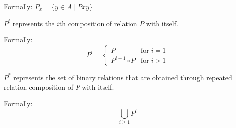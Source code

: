 \begin{definition}
\begin{subdefinition}
    Formally: \(P_x = \{ y \in A \mid Pxy \}\)
    \label{def:rel-acq} %
\end{subdefinition}

\begin{subdefinition}
    \(P^i\) represents the \(i\)th composition of relation \(P\) with itself.

    Formally: 
    \[
        P^i = 
        \begin{cases}
            P               & \text{for} \; i = 1\\
            P^{i-1} \circ P & \text{for} \; i > 1
        \end{cases}
    \]
    \label{def:rel-icomp}
\end{subdefinition}

\begin{subdefinition}
    \(P^*\) represents the set of binary relations that are obtained through repeated relation composition of \(P\) with itself.

    Formally:
    \[
        \bigcup_{i \geq 1} P^i
    \]
    \label{def:rel-star} %
\end{subdefinition}
\end{definition}

